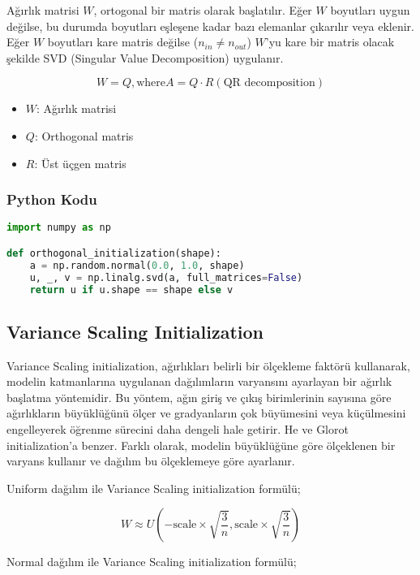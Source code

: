 Ağırlık matrisi $W$, ortogonal bir matris olarak başlatılır. Eğer $W$ boyutları uygun değilse, bu durumda boyutları eşleşene kadar bazı elemanlar çıkarılır veya eklenir. Eğer $W$ boyutları kare matris değilse ($n_{in} \neq n_{out}$) $W$'yu kare bir matris olacak şekilde SVD (Singular Value Decomposition) uygulanır.

\[ W = Q, \text{where} A = Q \cdot R (\text{QR decomposition}) \]

\begin{itemize}
    \item $W$: Ağırlık matrisi
    \item $Q$: Orthogonal matris
    \item $R$: Üst üçgen matris
\end{itemize}

\subsubsection{Python Kodu}

\begin{lstlisting}[language=Python]
import numpy as np

def orthogonal_initialization(shape):
    a = np.random.normal(0.0, 1.0, shape)
    u, _, v = np.linalg.svd(a, full_matrices=False)
    return u if u.shape == shape else v
\end{lstlisting}

\newpage

\subsection{Variance Scaling Initialization}

Variance Scaling initialization, ağırlıkları belirli bir ölçekleme faktörü kullanarak, modelin katmanlarına uygulanan dağılımların varyansını ayarlayan bir ağırlık başlatma yöntemidir. Bu yöntem, ağın giriş ve çıkış birimlerinin sayısına göre ağırlıkların büyüklüğünü ölçer ve gradyanların çok büyümesini veya küçülmesini engelleyerek öğrenme sürecini daha dengeli hale getirir. He ve Glorot initialization'a benzer. Farklı olarak, modelin büyüklüğüne göre ölçeklenen bir varyans kullanır ve dağılım bu ölçeklemeye göre ayarlanır.

Uniform dağılım ile Variance Scaling initialization formülü;

\[ W \approx U (-\text{scale} \times \sqrt{\frac{3}{n}}, \text{scale} \times \sqrt{\frac{3}{n}}) \]

Normal dağılım ile Variance Scaling initialization formülü;


